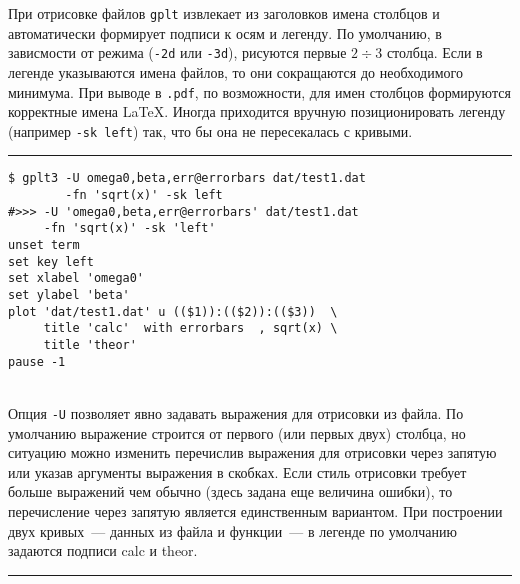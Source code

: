 \documentclass[12pt]{article}
\def\gplt{{\tt gplt}}
\def\pdf{{\tt .pdf}}
\begin{document}
\vspace{5mm}
При отрисовке файлов \gplt{} извлекает из заголовков имена столбцов и автоматически формирует подписи к осям и легенду.
По умолчанию, в зависмости от режима (\verb'-2d' или \verb'-3d'), рисуются первые $2\div3$ столбца.
Если в легенде указываются имена файлов,
то они сокращаются до необходимого минимума. При выводе в \pdf{}, по возможности, для имен столбцов формируются корректные имена \LaTeX.
Иногда приходится вручную позиционировать легенду (например \verb'-sk left') так, что бы она не пересекалась с кривыми.\\

\hrule %

\vspace{3mm}
\noindent
\begin{minipage}[b]{.59\textwidth}
\small
\begin{verbatim}
$ gplt3 -U omega0,beta,err@errorbars dat/test1.dat 
        -fn 'sqrt(x)' -sk left
#>>> -U 'omega0,beta,err@errorbars' dat/test1.dat 
     -fn 'sqrt(x)' -sk 'left'
unset term
set key left
set xlabel 'omega0'
set ylabel 'beta'
plot 'dat/test1.dat' u (($1)):(($2)):(($3))  \
     title 'calc'  with errorbars  , sqrt(x) \
     title 'theor'   
pause -1
\end{verbatim}
\end{minipage}
\\[5mm]
Опция \verb'-U' позволяет явно задавать выражения для  отрисовки из файла. По умолчанию выражение строится от первого (или первых двух) столбца,
но ситуацию можно изменить перечислив выражения для отрисовки через запятую или указав аргументы выражения в скобках. Если стиль
отрисовки требует больше выражений чем обычно (здесь задана еще величина ошибки), то перечисление через запятую является единственным вариантом.
При построении двух кривых~--- данных из файла и функции~--- в легенде по умолчанию задаются подписи calc и theor.\\

\hrule %
\end{document}

